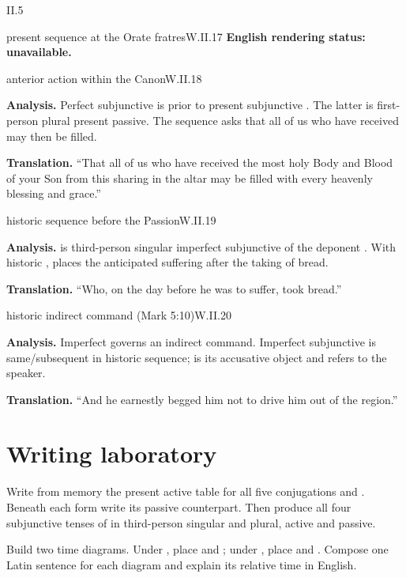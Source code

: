 \begin{courseunit}{II.5}
\begin{workedexample}{present sequence at the Orate fratres}{W.II.17}
\textbf{English rendering status: unavailable.}
\end{workedexample}

\begin{workedexample}{anterior action within the Canon}{W.II.18}

\textbf{Analysis.}  Perfect subjunctive  is prior to present subjunctive
.  The latter is first-person plural present passive.  The sequence asks that
all of us who have received may then be filled.

\textbf{Translation.}  ``That all of us who have received the most holy Body and Blood of your
Son from this sharing in the altar may be filled with every heavenly blessing and grace.''
\end{workedexample}

\begin{workedexample}{historic sequence before the Passion}{W.II.19}

\textbf{Analysis.}   is third-person singular imperfect subjunctive of the
deponent .  With historic ,  places the
anticipated suffering after the taking of bread.

\textbf{Translation.}  ``Who, on the day before he was to suffer, took bread.''
\end{workedexample}

\begin{workedexample}{historic indirect command (Mark 5:10)}{W.II.20}

\textbf{Analysis.}  Imperfect  governs an indirect command.  Imperfect
subjunctive  is same/subsequent in historic sequence;  is its
accusative object and refers to the speaker.

\textbf{Translation.}  ``And he earnestly begged him not to drive him out of the region.''
\end{workedexample}

\section{Writing laboratory}

Write from memory the present active table for all five conjugations and .  Beneath
each form write its passive counterpart.  Then produce all four subjunctive tenses of
 in third-person singular and plural, active and passive.

Build two time diagrams.  Under , place  and ; under
, place  and .  Compose one Latin sentence for
each diagram and explain its relative time in English.



\end{courseunit}

